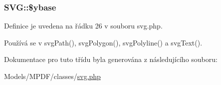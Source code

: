 \hypertarget{class_s_v_g_a6ef0f926687479e0ebd731660a89cd28}{
\subsubsection[{\$ybase}]{\setlength{\rightskip}{0pt plus 5cm}S\-V\-G\-::\$ybase}}\label{class_s_v_g_a6ef0f926687479e0ebd731660a89cd28}


Definice je uvedena na řádku 26 v souboru svg.\-php.



Používá se v svg\-Path(), svg\-Polygon(), svg\-Polyline() a svg\-Text().



Dokumentace pro tuto třídu byla generována z následujícího souboru\-:\begin{DoxyCompactItemize}
\item 
Models/\-M\-P\-D\-F/classes/\hyperlink{svg_8php}{svg.\-php}\end{DoxyCompactItemize}
